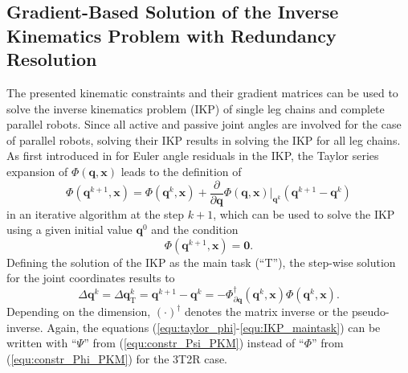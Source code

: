 \documentclass[robotics,article,submit,moreauthors,pdftex]{Definitions/mdpi}
\newcommand{\bm}[1]{\boldsymbol{#1}}
\let\Phi\varPhi
\let\Psi\varPsi
\begin{document}
\subsection{Gradient-Based Solution of the Inverse Kinematics Problem with Redundancy Resolution}
\label{sec:ZB_Anwendung_IK_grad}

The presented kinematic constraints and their gradient matrices can be used to solve the inverse kinematics problem (IKP) of single leg chains and complete parallel robots.
Since all active and passive joint angles are involved for the case of parallel robots, solving their IKP results in solving the IKP for all leg chains.
As first introduced in \cite{GoldenbergBenFen1985} for Euler angle residuals in the IKP, the Taylor series expansion of $\bm{\Phi}(\bm{q},\bm{x})$ leads to the definition of
%
\begin{equation}
\bm{\Phi}(\bm{q}^{k+1},\bm{x}) = 
\bm{\Phi}(\bm{q}^{k},\bm{x})
+
\frac{\partial}{\partial \bm{q}} \bm{\Phi}(\bm{q},\bm{x}) \biggr\rvert_{\bm{q}^k} (\bm{q}^{k+1} - \bm{q}^k)
\label{equ:taylor_phi}
\end{equation}
%
in an iterative algorithm at the step $k+1$, which can be used to solve the IKP using a given initial value $\bm{q}^{0}$ and the condition
\begin{equation}
\bm{\Phi}(\bm{q}^{k+1},\bm{x})=\bm{0}.
\label{equ:taylor_phi_nextstepzero}
\end{equation}
%
Defining the solution of the IKP as the main task (``T''), the step-wise solution for the joint coordinates results to
\begin{equation}
{\Delta}\bm{q}^{k}
=
{\Delta}\bm{q}_{\mathrm{T}}^k
=
\bm{q}^{k+1} - \bm{q}^k
=
-\bm{\Phi}_{\partial\bm{q}}^{\dagger}(\bm{q}^k,\bm{x}) \bm{\Phi}(\bm{q}^k,\bm{x}).
\label{equ:IKP_maintask}
\end{equation}
%
Depending on the dimension, $(\cdot)^\dagger$ denotes the matrix inverse or the pseudo-inverse.
Again, the equations (\ref{equ:taylor_phi}-\ref{equ:IKP_maintask}) can be written with ``$\bm{\Psi}$'' from (\ref{equ:constr_Psi_PKM}) instead of ``$\bm{\Phi}$'' from (\ref{equ:constr_Phi_PKM}) for the 3T2R case.
\end{document}

